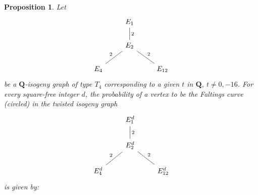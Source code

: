 \documentclass[11pt]{article}
\newtheorem{prop}[defn]{Proposition}
\theoremstyle{definition}
\begin{document}
\begin{prop}
Let 
\[ \begin{tikzcd}
& E_1 \ar[dash,d,"2"] & \\
& E_2 \ar[dash,ld,swap,"2"] \ar[dash,rd,"2"] & \\
E_4   & &  E_{12}   
\end{tikzcd}
\]
be a $\mathbf{Q}$-isogeny graph of type $T_4$ corresponding to a given $t$ in $\mathbf{Q}$, $t
\ne 0,-16$. For every square-free integer $d$, 
the probability of a vertex
to be the Faltings curve (circled)
in the twisted isogeny graph 
\[ \begin{tikzcd}
& E^d_1 \ar[dash,d,"2"] & \\
& E^d_2 \ar[dash,ld,swap,"2"] \ar[dash,rd,"2"] & \\
E^d_4   & &  E^d_{12}   
\end{tikzcd}
\] 
is given by:

\newpage


\end{prop}
\end{document}
